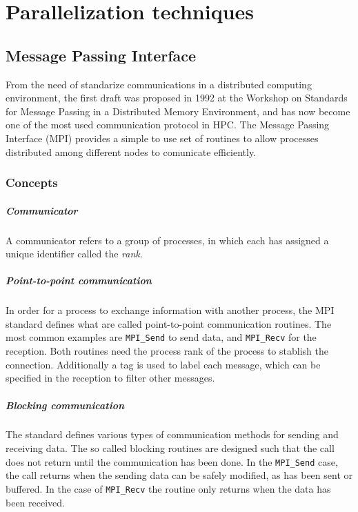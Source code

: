 \chapter{Parallelization techniques}

\section{Message Passing Interface}

From the need of standarize communications in a distributed computing
environment, the first draft was proposed in 1992 at the Workshop on Standards
for Message Passing in a Distributed Memory Environment, and has now become one
of the most used communication protocol in HPC. The Message Passing Interface
(MPI) provides a simple to use set of routines to allow processes distributed
among different nodes to comunicate efficiently.

\subsection{Concepts}


\paragraph{Communicator} A communicator refers to a group of processes, in which
each has assigned a unique identifier called the \textit{rank}.

\paragraph{Point-to-point communication} In order for a process to exchange
information with another process, the MPI standard defines what are called
point-to-point communication routines. The most common examples are
\texttt{MPI\_Send} to send data, and \texttt{MPI\_Recv} for the reception.
Both routines need the process rank of the process to stablish the connection.
Additionally a tag is used to label each message, which can be specified in the
reception to filter other messages.

\paragraph{Blocking communication} The standard defines various types of
communication methods for sending and receiving data. The so called blocking
routines are designed such that the call does not return until the communication
has been done. In the \texttt{MPI\_Send} case, the call returns when the sending
data can be safely modified, as has been sent or buffered. In the case of
\texttt{MPI\_Recv} the routine only returns when the data has been received.

